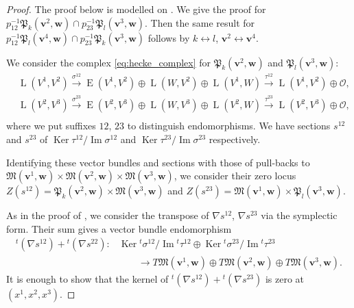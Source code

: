\documentclass[12pt]{amsart}
\def\frak{\mathfrak}
\theoremstyle{definition}
\theoremstyle{remark}
\numberwithin{equation}{subsection}
\newcommand{\Ker}{\operatorname{Ker}}
\newcommand{\Ima}{\operatorname{Im}}
\newcommand{\M}{{\frak M}} %
\newcommand{\bv}{{\mathbf v}} %
\newcommand{\bw}{{\mathbf w}} %
\newcommand{\Pa}{{\frak P}} %
\newcommand{\HomE}{\operatorname{E}}
\newcommand{\HomL}{\operatorname{L}}
\newcommand{\shfO}{\mathcal O}
\begin{document}
\begin{proof}
The proof below is modelled on \cite[9.8, 9.9]{Na-alg}.
We give the proof for $p_{12}^{-1}\Pa_k(\bv^2,\bw) \cap
p_{23}^{-1}\Pa_{l}(\bv^3,\bw)$. Then the same result for
$p_{12}^{-1}\Pa_{l}(\bv^4,\bw) \cap p_{23}^{-1}\Pa_{k}(\bv^3,\bw)$
follows by $k\leftrightarrow l$, $\bv^2 \leftrightarrow \bv^4$.

We consider the complex \eqref{eq:hecke_complex} for
$\Pa_k(\bv^2,\bw)$ and $\Pa_l(\bv^3,\bw)$:
\begin{equation*}
\begin{split}
        & \HomL(V^1, V^2)
        \overset{\sigma^{12}}{\longrightarrow}
        \HomE(V^1,V^2) \oplus \HomL(W, V^2) \oplus \HomL(V^1,W)
        \overset{\tau^{12}}{\longrightarrow}
        \HomL(V^1, V^2) \oplus \shfO, \\
        & \HomL(V^2, V^3)
        \overset{\sigma^{23}}{\longrightarrow}
        \HomE(V^2,V^3) \oplus \HomL(W, V^3) \oplus \HomL(V^2,W)
        \overset{\tau^{23}}{\longrightarrow}
        \HomL(V^2, V^3) \oplus \shfO, \\
\end{split}
\end{equation*}
where we put suffixes $12$, $23$ to distinguish endomorphisms.
We have sections $s^{12}$ and $s^{23}$ of $\Ker \tau^{12}/\Ima \sigma^{12}$
and $\Ker \tau^{23}/\Ima \sigma^{23}$ respectively.

Identifying these vector bundles and sections with those of pull-backs to
$\M(\bv^1,\bw)\times\M(\bv^2,\bw)\times\M(\bv^3,\bw)$,
we consider their zero locus 
$Z(s^{12}) = \Pa_k(\bv^2,\bw)\times\M(\bv^3,\bw)$ and
$Z(s^{23}) = \M(\bv^1,\bw)\times \Pa_{l}(\bv^3,\bw)$.

As in the proof of \cite[5.7]{Na-alg}, we consider the
transpose of $\nabla s^{12}$, $\nabla s^{23}$ via the symplectic form.
Their sum gives a vector bundle endomorphism
\begin{equation*}
\begin{split}
        {}^t (\nabla s^{12}) + {}^t (\nabla s^{22})
        \colon & \Ker{}^t \sigma^{12} / \Ima {}^t \tau^{12} \oplus
        \Ker{}^t \sigma^{23} / \Ima {}^t \tau^{23} \\
        &\qquad
        \to T\M(\bv^1,\bw)\oplus T\M(\bv^2,\bw)\oplus T\M(\bv^3,\bw).
\end{split}
\end{equation*}
It is enough to show that the kernel of
${}^t (\nabla s^{12}) + {}^t (\nabla s^{23})$ is zero at $(x^1, x^2, x^3)$.


\end{proof}
\end{document}
